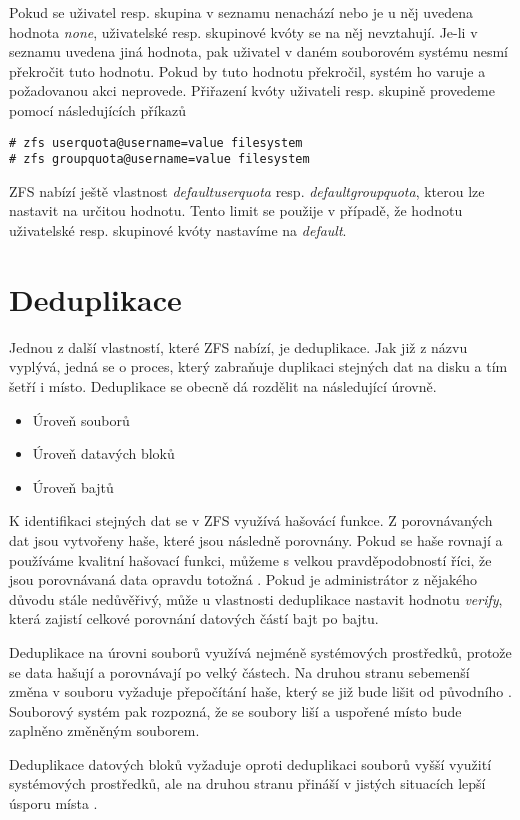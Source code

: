 Pokud se uživatel resp. skupina v seznamu nenachází nebo je u něj uvedena hodnota \emph{none}, uživatelské resp. skupinové kvóty se na něj nevztahují. Je-li v seznamu uvedena jiná hodnota, pak uživatel v daném souborovém systému nesmí překročit tuto hodnotu. Pokud by tuto hodnotu překročil, systém ho varuje a požadovanou akci neprovede. Přiřazení kvóty uživateli resp. skupině provedeme pomocí následujících příkazů
\begin{verbatim}
# zfs userquota@username=value filesystem
# zfs groupquota@username=value filesystem
\end{verbatim}

ZFS nabízí ještě vlastnost \emph{defaultuserquota} resp. \emph{defaultgroupquota}, kterou lze nastavit na určitou hodnotu. Tento limit se použije v případě, že hodnotu uživatelské resp. skupinové kvóty nastavíme na \emph{default}.
\section{Deduplikace}
\label{dedup}
Jednou z další vlastností, které ZFS nabízí, je deduplikace. Jak již z názvu vyplývá, jedná se o proces, který zabraňuje duplikaci stejných dat na disku a tím šetří i místo. Deduplikace se obecně dá rozdělit na následující úrovně.
\begin{itemize}
  \item Úroveň souborů
  \item Úroveň datavých bloků
  \item Úroveň bajtů
\end{itemize}

K identifikaci stejných dat se v ZFS využívá hašovácí funkce. Z porovnávaných dat jsou vytvořeny haše, které jsou následně porovnány. Pokud se haše rovnají a používáme kvalitní hašovací funkci, můžeme s velkou pravděpodobností říci, že jsou porovnávaná data opravdu totožná \cite{dedup}. Pokud je administrátor z nějakého důvodu stále nedůvěřivý, může u vlastnosti deduplikace nastavit hodnotu \emph{verify}, která zajistí celkové porovnání datových částí bajt po bajtu.

Deduplikace na úrovni souborů využívá nejméně systémových prostředků, protože se data hašují a porovnávají po velký částech. Na druhou stranu sebemenší změna v souboru vyžaduje přepočítání haše, který se již bude lišit od původního \cite{dedup}. Souborový systém pak rozpozná, že se soubory liší a uspořené místo bude zaplněno změněným souborem.

Deduplikace datových bloků vyžaduje oproti deduplikaci souborů vyšší využití systémových prostředků, ale na druhou stranu přináší v jistých situacích lepší úsporu místa \cite{dedup}.

